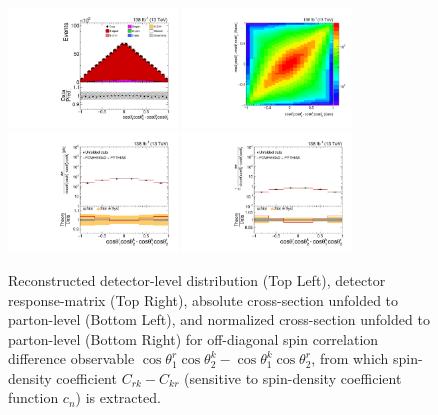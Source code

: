 \clearpage
\begin{figure}[htb]
\begin{center}
 \includegraphics[width=0.40\textwidth]{fig_fullRun2UL/controlplots/combined/Hyp_LLBarCMrk.pdf}
 \includegraphics[width=0.40\textwidth]{fig_fullRun2UL/unfolding/combined/ResponseMatrix_c_Mrk.pdf} \\
 \includegraphics[width=0.40\textwidth]{fig_fullRun2UL/unfolding/combined/UnfoldedResults_c_Mrk.pdf}
 \includegraphics[width=0.40\textwidth]{fig_fullRun2UL/unfolding/combined/UnfoldedResultsNorm_c_Mrk.pdf} \\
\label{fig:c_Mrk}
\caption{Reconstructed detector-level distribution (Top Left), detector response-matrix (Top Right), absolute cross-section unfolded to parton-level (Bottom Left), and normalized cross-section unfolded to parton-level (Bottom Right) for off-diagonal spin correlation difference observable $\cos\theta_{1}^{r}\cos\theta_{2}^{k}-\cos\theta_{1}^{k}\cos\theta_{2}^{r}$, from which spin-density coefficient $C_{rk}-C_{kr}$ (sensitive to spin-density coefficient function $c_n$) is extracted.}
\end{center}
\end{figure}
